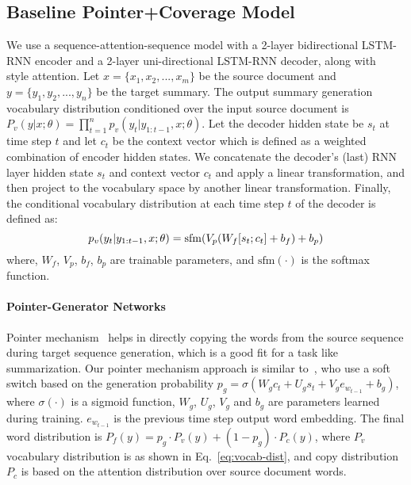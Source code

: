 \documentclass[11pt,a4paper]{article}
\begin{document}
\subsection{Baseline Pointer+Coverage Model}
\label{subsec:attention-model}
We use a sequence-attention-sequence model with a 2-layer bidirectional LSTM-RNN encoder and a 2-layer uni-directional LSTM-RNN decoder, along with~ style attention. Let $x=\{x_1,x_2,...,x_m\}$ be the source document and $y=\{y_1,y_2,...,y_n\}$ be the target summary. The output summary generation vocabulary distribution conditioned over the input source document is $P_v(y|x;\theta) = \prod_{t=1}^{n}p_v(y_t|y_{1:t-1},x;\theta)$.
Let the decoder hidden state be $s_t$ at time step $t$ and let $c_t$ be the context vector which is defined as a weighted combination of encoder hidden states. We concatenate the decoder's (last) RNN layer hidden state $s_t$ and context vector $c_t$ and apply a linear transformation, and then project to the vocabulary space by another linear transformation. Finally, the conditional vocabulary distribution at each time step $t$ of the decoder is defined as: 
\begin{equation}
\begin{small}
\label{eq:vocab-dist}
p_v(y_t|y_{1:t-1},x;\theta) = \mathrm{sfm} (V_p(W_f[s_t;c_t]+b_f)+b_p)
\end{small}
\end{equation}
where, $W_f$, $V_p$, $b_f$, $b_p$ are trainable parameters, and $\mathrm{sfm(\cdot)}$ is the softmax function. 


\paragraph{Pointer-Generator Networks}
\label{subsec:pointer-model}
Pointer mechanism~\cite{vinyals2015pointer} helps in directly copying the words from the source sequence during target sequence generation, which is a good fit for a task like summarization. Our pointer mechanism approach is similar to~, who use a soft switch based on the generation probability $p_g = \sigma(W_g c_t+U_g s_t + V_g e_{w_{t-1}} + b_g)$, where $\sigma (\cdot)$ is a sigmoid function, $W_g$, $U_g$, $V_g$ and $b_g$ are parameters learned during training. $e_{w_{t-1}}$ is the previous time step output word embedding. The final word distribution is $P_f(y) = p_g \cdot P_v(y) + (1-p_g) \cdot P_c(y)$, where $P_v$ vocabulary distribution is as shown in Eq.~\ref{eq:vocab-dist}, and copy distribution $P_c$ is based on the attention distribution over source document words. 
\end{document}

